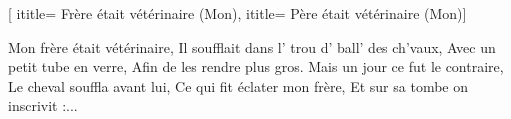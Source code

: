 [
ititle= {Frère était vétérinaire (Mon)},
ititle= {Père était vétérinaire (Mon)}]

\beginverse
Mon frère était vétérinaire,
Il soufflait dans l' trou d' ball' des ch'vaux,
Avec un petit tube en verre,
Afin de les rendre plus gros.
Mais un jour ce fut le contraire,
Le cheval souffla avant lui,
Ce qui fit éclater mon frère,
Et sur sa tombe on inscrivit :...
\endverse
\endsong